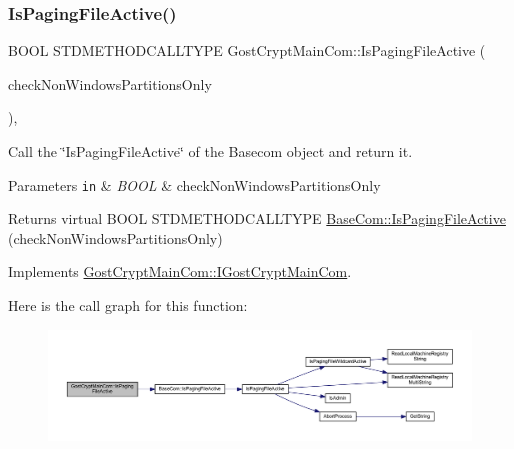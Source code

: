 \subsubsection{\texorpdfstring{Is\+Paging\+File\+Active()}{IsPagingFileActive()}}
{\footnotesize\ttfamily B\+O\+OL S\+T\+D\+M\+E\+T\+H\+O\+D\+C\+A\+L\+L\+T\+Y\+PE Gost\+Crypt\+Main\+Com\+::\+Is\+Paging\+File\+Active (\begin{DoxyParamCaption}\item[{B\+O\+OL}]{check\+Non\+Windows\+Partitions\+Only }\end{DoxyParamCaption})\hspace{0.3cm}{\ttfamily [inline]}, {\ttfamily [virtual]}}



Call the \char`\"{}\+Is\+Paging\+File\+Active\char`\"{} of the Basecom object and return it. 


\begin{DoxyParams}[1]{Parameters}
\mbox{\tt in}  & {\em B\+O\+OL} & check\+Non\+Windows\+Partitions\+Only \\
\hline
\end{DoxyParams}
\begin{DoxyReturn}{Returns}
virtual B\+O\+OL S\+T\+D\+M\+E\+T\+H\+O\+D\+C\+A\+L\+L\+T\+Y\+PE \hyperlink{class_base_com_a41aa000a52c4c44d20b142c8868ef4ea}{Base\+Com\+::\+Is\+Paging\+File\+Active} (check\+Non\+Windows\+Partitions\+Only) 
\end{DoxyReturn}


Implements \hyperlink{interface_gost_crypt_main_com_1_1_i_gost_crypt_main_com}{Gost\+Crypt\+Main\+Com\+::\+I\+Gost\+Crypt\+Main\+Com}.

Here is the call graph for this function\+:
\nopagebreak
\begin{figure}[H]
\begin{center}
\leavevmode
\includegraphics[width=350pt]{class_gost_crypt_main_com_afd2c6c9964abf54b5eed75e2fda9ce7b_cgraph}
\end{center}
\end{figure}
\mbox{\label{class_gost_crypt_main_com_a9bebb998c60ef2b24d0d4fcc9e514db3}} 

